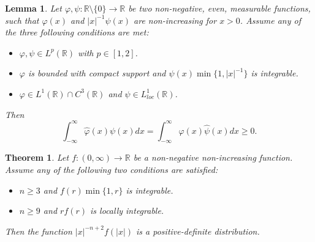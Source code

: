 \documentclass[10pt,a4paper]{amsart}
\newtheorem{theorem}{Theorem}
\newtheorem{lemma}{Lemma}
\def \R {\mathbb R}
\begin{document}
\begin{lemma}
	\label{lem_decreasing_dim1}
	Let $\varphi, \psi:\R \setminus \{0\} \to \R$ be two non-negative, even, measurable functions, such that $\varphi(x)$ and $|x|^{-1} \psi(x)$ are non-increasing for $x>0$.
	Assume any of the three following conditions are met:
	\begin{itemize}
		\item $\varphi, \psi \in L^p(\R)$ with $p \in [1,2]$.
		\item $\varphi$ is bounded with compact support and $\psi(x) \min\{1, |x|^{-1}\}$ is integrable.
		\item $ \varphi \in L^1(\R) \cap C^3(\R)$ and $\psi \in L^1_{loc}(\R)$.
	\end{itemize}
	Then 
	\begin{equation}
		\label{eq_positive_product}
		\int_{-\infty}^{\infty} \hat \varphi(x) \psi(x) dx = \int_{-\infty}^{\infty} \varphi(x) \hat \psi(x) dx \geq 0.
	\end{equation}

\end{lemma}

\begin{theorem}
	\label{thm_decreasing_dimn}
	Let $f:(0,\infty) \to \R$ be a non-negative non-increasing function.
	Assume any of the following two conditions are satisfied:
	\begin{itemize}
		\item $n \geq 3$ and $f(r) \min\{1, r\}$ is integrable.
		\item $n \geq 9$ and $r f(r)$ is locally integrable.
	\end{itemize}
	Then the function $|x|^{-n+2} f(|x|)$ is a positive-definite distribution.
\end{theorem}
\end{document}
